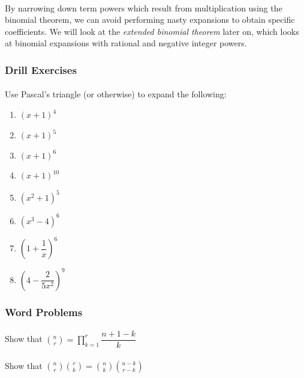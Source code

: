 \documentclass[12pt, a4paper, titlepage, twoside]{article}
\begin{document}
	\paragraph{}
	By narrowing down term powers which result from multiplication using the binomial theorem, we can avoid performing 
	nasty expansions to obtain specific coefficients. We will look at the \textit{extended binomial theorem} later on, which looks at
	binomial expansions with rational and negative integer powers.


	\subsubsection*{Drill Exercises}	
	
	\paragraph{}
	 Use Pascal's triangle (or otherwise) to expand the following:
	
	\begin{multicols}{2}
		\begin{enumerate}[label=\textbf{(\alph*)}]
			\item $(x+1)^4$
			\item $(x+1)^5$
			\item $(x+1)^6$
			\item $(x+1)^10$
			\item $(x^2+1)^5$
			\item $(x^3 - 4)^6$
			\item $\left(1 + \dfrac{1}{x}\right)^6$
			\item $(4 - \dfrac{2}{5x^2})^9$
		\end{enumerate}	
	\end{multicols}

	\subsubsection*{Word Problems}	
	
	\paragraph{}
	 Show that $\displaystyle {n \choose r} = \prod_{k=1}^r \dfrac{n+1 - k}{k}$
	
	\paragraph{}
	 Show that $\displaystyle {n \choose r} {r \choose k} = {n \choose k} {{n-k} \choose {r-k}}$
	
\end{document}
